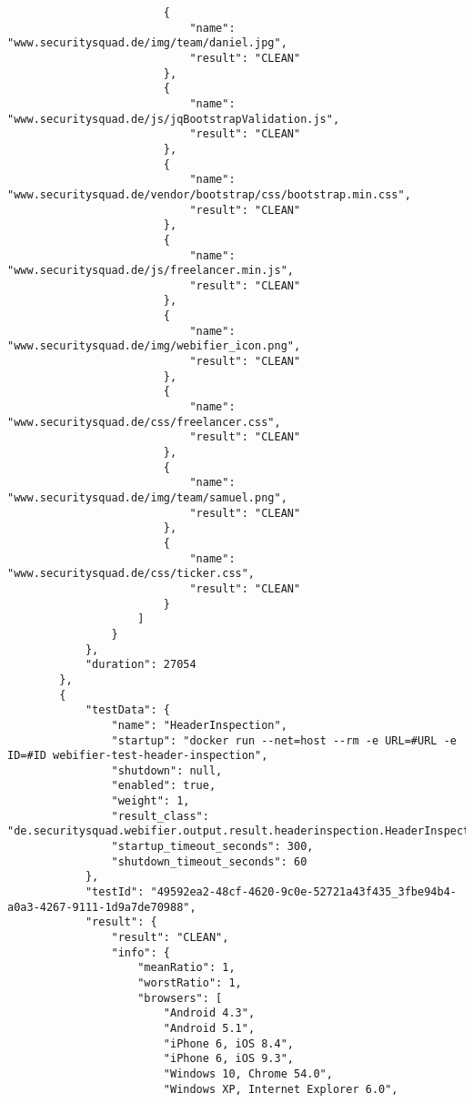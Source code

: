 \begin{scriptsize}
\begin{lstlisting}
                        {
                            "name": "www.securitysquad.de/img/team/daniel.jpg",
                            "result": "CLEAN"
                        },
                        {
                            "name": "www.securitysquad.de/js/jqBootstrapValidation.js",
                            "result": "CLEAN"
                        },
                        {
                            "name": "www.securitysquad.de/vendor/bootstrap/css/bootstrap.min.css",
                            "result": "CLEAN"
                        },
                        {
                            "name": "www.securitysquad.de/js/freelancer.min.js",
                            "result": "CLEAN"
                        },
                        {
                            "name": "www.securitysquad.de/img/webifier_icon.png",
                            "result": "CLEAN"
                        },
                        {
                            "name": "www.securitysquad.de/css/freelancer.css",
                            "result": "CLEAN"
                        },
                        {
                            "name": "www.securitysquad.de/img/team/samuel.png",
                            "result": "CLEAN"
                        },
                        {
                            "name": "www.securitysquad.de/css/ticker.css",
                            "result": "CLEAN"
                        }
                    ]
                }
            },
            "duration": 27054
        },
        {
            "testData": {
                "name": "HeaderInspection",
                "startup": "docker run --net=host --rm -e URL=#URL -e ID=#ID webifier-test-header-inspection",
                "shutdown": null,
                "enabled": true,
                "weight": 1,
                "result_class": "de.securitysquad.webifier.output.result.headerinspection.HeaderInspectionResultInfo",
                "startup_timeout_seconds": 300,
                "shutdown_timeout_seconds": 60
            },
            "testId": "49592ea2-48cf-4620-9c0e-52721a43f435_3fbe94b4-a0a3-4267-9111-1d9a7de70988",
            "result": {
                "result": "CLEAN",
                "info": {
                    "meanRatio": 1,
                    "worstRatio": 1,
                    "browsers": [
                        "Android 4.3",
                        "Android 5.1",
                        "iPhone 6, iOS 8.4",
                        "iPhone 6, iOS 9.3",
                        "Windows 10, Chrome 54.0",
                        "Windows XP, Internet Explorer 6.0",

\end{lstlisting}
\end{scriptsize}
